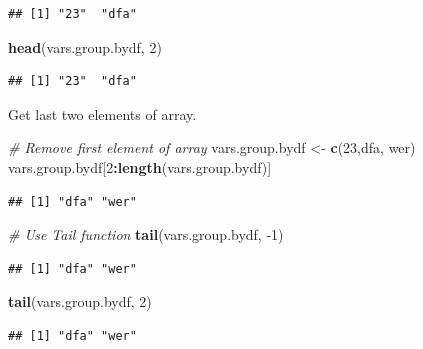 \documentclass[
]{book}
\newenvironment{Shaded}{\begin{snugshade}}{\end{snugshade}}
\newcommand{\CommentTok}[1]{\textcolor[rgb]{0.56,0.35,0.01}{\textit{#1}}}
\newcommand{\DecValTok}[1]{\textcolor[rgb]{0.00,0.00,0.81}{#1}}
\newcommand{\KeywordTok}[1]{\textcolor[rgb]{0.13,0.29,0.53}{\textbf{#1}}}
\newcommand{\NormalTok}[1]{#1}
\newcommand{\OperatorTok}[1]{\textcolor[rgb]{0.81,0.36,0.00}{\textbf{#1}}}
\newcommand{\StringTok}[1]{\textcolor[rgb]{0.31,0.60,0.02}{#1}}
\begin{document}
\begin{verbatim}
## [1] "23"  "dfa"
\end{verbatim}

\begin{Shaded}
\begin{Highlighting}[]
\KeywordTok{head}\NormalTok{(vars.group.bydf, }\DecValTok{2}\NormalTok{)}
\end{Highlighting}
\end{Shaded}

\begin{verbatim}
## [1] "23"  "dfa"
\end{verbatim}

Get last two elements of array.

\begin{Shaded}
\begin{Highlighting}[]
\CommentTok{\# Remove first element of array}
\NormalTok{vars.group.bydf \textless{}{-}}\StringTok{ }\KeywordTok{c}\NormalTok{(}\StringTok{\textquotesingle{}23\textquotesingle{}}\NormalTok{,}\StringTok{\textquotesingle{}dfa\textquotesingle{}}\NormalTok{, }\StringTok{\textquotesingle{}wer\textquotesingle{}}\NormalTok{)}
\NormalTok{vars.group.bydf[}\DecValTok{2}\OperatorTok{:}\KeywordTok{length}\NormalTok{(vars.group.bydf)]}
\end{Highlighting}
\end{Shaded}

\begin{verbatim}
## [1] "dfa" "wer"
\end{verbatim}

\begin{Shaded}
\begin{Highlighting}[]
\CommentTok{\# Use Tail function}
\KeywordTok{tail}\NormalTok{(vars.group.bydf, }\DecValTok{{-}1}\NormalTok{)}
\end{Highlighting}
\end{Shaded}

\begin{verbatim}
## [1] "dfa" "wer"
\end{verbatim}

\begin{Shaded}
\begin{Highlighting}[]
\KeywordTok{tail}\NormalTok{(vars.group.bydf, }\DecValTok{2}\NormalTok{)}
\end{Highlighting}
\end{Shaded}

\begin{verbatim}
## [1] "dfa" "wer"
\end{verbatim}
\end{document}
